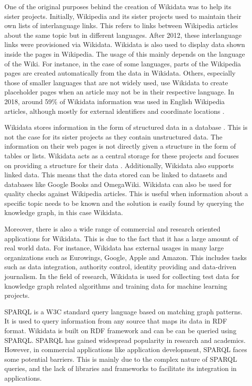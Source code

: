 One of the original purposes behind the creation of Wikidata was to help its sister projects. Initially, Wikipedia and its sister projects used to maintain their own lists of interlanguage links. This refers to links between Wikipedia articles about the same topic but in different languages. After 2012, these interlanguage links were provisioned via Wikidata. Wikidata is also used to display data shown inside the pages in Wikipedia. The usage of this mainly depends on the language of the Wiki. For instance, in the case of some languages, parts of the Wikipedia pages are created automatically from the data in Wikidata. Others, especially those of smaller languages that are not widely used, use Wikidata to create placeholder pages when an article may not be in their respective language. In 2018, around 59\% of Wikidata information was used in English Wikipedia articles, although mostly for external identifiers and coordinate locations \cite{Wikipedia2017}.

Wikidata stores information in the form of structured data in a database \cite{Tharani2021}. This is not the case for its sister projects as they contain unstructured data. The information on their web pages is not directly given a structure in the form of tables or lists. Wikidata acts as a central storage for these projects and focuses on providing a structure for their data \cite{Wikidata2014}. Additionally, Wikidata also supports linked data. This means that the data stored can be linked to datasets and databases like Google Books and OmegaWiki. Wikidata can also be used for quality checks against Wikipedia articles. This is useful when information about a specific topic needs to be known and the solution is easily found by querying the knowledge graph, in this case Wikidata.

Moreover, there is also a wide range of commercial and research oriented applications for Wikidata. This is due to the fact that it has a large amount of real world data. For instance, Wikidata has external usages in many large organizations such as Eurowings, Google, Apple and Amazon. This includes tasks such as data integration, authority control, identity providing and data-driven journalism. In the field of research, Wikidata is used for collecting test data for knowledge graph related algorithms and training data for machine learning projects.

SPARQL is a W3C standard query language based on matching graph patterns. It is used to query information from any source that maps its data in RDF format. Wikidata is built on RDF framework and can be can be queried using SPARQL. SPARQL has gained widespread popularity in research and academics. However, in commercial applications like application development, SPARQL faces some potential barriers. This is mainly due to the complex nature of SPARQL queries, and the lack of libraries and frameworks to facilitate its integration in applications. 

